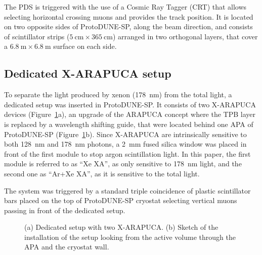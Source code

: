 \documentclass[a4paper]{article}
\begin{document}
The PDS is triggered with the use of a Cosmic Ray Tagger (CRT) \cite{Abi_2020} that allows selecting horizontal crossing muons and provides the track position. It is located on two opposite sides of ProtoDUNE-SP, along the beam direction, and consists of scintillator strips ($\SI{5}{\centi\meter} \times \SI{365}{\centi\meter}$) arranged in two orthogonal layers, that cover a $\SI{6.8}{\meter} \times \SI{6.8}{\meter}$ surface on each side.

\subsection{Dedicated X-ARAPUCA setup}
To separate the light produced by xenon (\SI{178}{\nano\meter}) from the total light, a dedicated setup was inserted in ProtoDUNE-SP. It consists of two X-ARAPUCA  \cite{Machado_2018, Brizzolari_2021} devices (Figure~\ref{fig:xarapuca}a), an upgrade of the ARAPUCA concept where the TPB layer is replaced by a wavelength shifting guide, that were located behind one APA of ProtoDUNE-SP (Figure~\ref{fig:xarapuca}b). Since X-ARAPUCA are intrinsically sensitive to both \SI{128}{\nano\meter} and \SI{178}{\nano\meter} photons, a \SI{2}{\milli\meter} fused silica window was placed in front of the first module to stop argon scintillation light. In this paper, the first module is referred to as ``Xe XA'', as only sensitive to \SI{178}{\nano\meter} light, and the second one as ``Ar+Xe XA'', as it is sensitive to the total light.

The system was triggered by a standard triple coincidence of plastic scintillator bars placed on the top of ProtoDUNE-SP cryostat selecting vertical muons passing in front of the dedicated setup.

\begin{figure}
    \centering
    \caption{(a) Dedicated setup with two X-ARAPUCA. (b) Sketch of the installation of the setup looking from the active volume through the APA and the cryostat wall.}
    \label{fig:xarapuca}
\end{figure}
\end{document}
